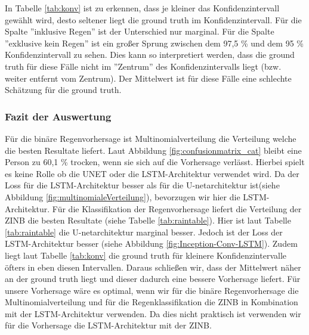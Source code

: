 \noindent In Tabelle \ref{tab:konv} ist zu erkennen, dass je kleiner das Konfidenzintervall gewählt wird, desto seltener liegt die ground truth im Konfidenzintervall.
Für die Spalte ''inklusive Regen'' ist der Unterschied nur marginal. Für die Spalte ''exklusive kein Regen'' ist ein großer Sprung zwischen dem 97,5 \% und dem 95 \% Konfidenzintervall zu sehen.
Dies kann so interpretiert werden, dass die ground truth für diese Fälle nicht im ''Zentrum'' des Konfidenzintervalls liegt (bzw. weiter entfernt vom Zentrum). Der Mittelwert ist für diese Fälle eine schlechte Schätzung für die ground truth.\\



\subsubsection{Fazit der Auswertung}

Für die binäre Regenvorhersage ist Multinomialverteilung die Verteilung welche die besten Resultate liefert. Laut Abbildung \ref{fig:confusionmatrix_cat} bleibt eine Person zu 60,1 \% trocken, wenn sie sich auf die Vorhersage verlässt. Hierbei spielt es keine Rolle ob die UNET oder die LSTM-Architektur verwendet wird. Da der Loss für die LSTM-Architektur besser als für die U-netarchitektur ist(siehe Abbildung \ref{fig:multinomialeVerteilung}), bevorzugen wir hier die LSTM-Architektur. Für die Klassifikation der Regenvorhersage liefert die Verteilung der ZINB die besten Resultate (siehe Tabelle \ref{tab:raintable}). Hier ist laut Tabelle \ref{tab:raintable} die U-netarchitektur marginal besser. Jedoch ist der Loss der LSTM-Architektur besser (siehe Abbildung \ref{fig:Inception-Conv-LSTM}). Zudem liegt laut Tabelle \ref{tab:konv} die ground truth für kleinere Konfidenzintervalle öfters in eben diesen Intervallen. Daraus schließen wir, dass der Mittelwert näher an der ground truth liegt und dieser dadurch eine bessere Vorhersage liefert. Für unsere Vorhersage wäre es optimal, wenn wir für die binäre Regenvorhersage die Multinomialverteilung und für die Regenklassifikation die ZINB in Kombination mit der LSTM-Architektur verwenden. Da dies nicht praktisch ist verwenden wir für die Vorhersage die LSTM-Architektur mit der ZINB.


